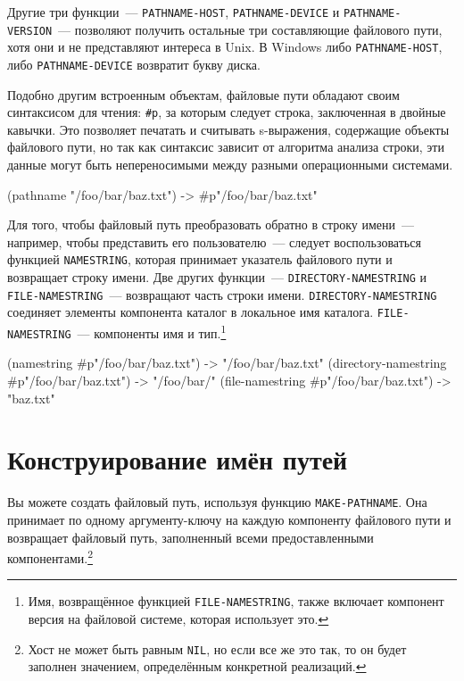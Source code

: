 Другие три функции~--- \lstinline{PATHNAME-HOST}, \lstinline{PATHNAME-DEVICE} и
\lstinline{PATHNAME-VERSION}~--- позволяют получить остальные три составляющие файлового пути,
хотя они и не представляют интереса в Unix. В Windows либо \lstinline{PATHNAME-HOST}, либо
\lstinline{PATHNAME-DEVICE} возвратит букву диска.

Подобно другим встроенным объектам, файловые пути обладают своим синтаксисом для чтения:
\lstinline!#p!, за которым следует строка, заключенная в двойные кавычки. Это позволяет
печатать и считывать s-выражения, содержащие объекты файлового пути, но так как синтаксис
зависит от алгоритма анализа строки, эти данные могут быть непереносимыми между разными
операционными системами.

\begin{myverb}
(pathname "/foo/bar/baz.txt") -> #p"/foo/bar/baz.txt" 
\end{myverb}

Для того, чтобы файловый путь преобразовать обратно в строку имени~--- например, чтобы
представить его пользователю~--- следует воспользоваться функцией \lstinline{NAMESTRING},
которая принимает указатель файлового пути и возвращает строку имени. Две других
функции~--- \lstinline{DIRECTORY-NAMESTRING} и \lstinline{FILE-NAMESTRING}~--- возвращают часть
строки имени. \lstinline{DIRECTORY-NAMESTRING} соединяет элементы компонента каталог в
локальное имя каталога. \lstinline{FILE-NAMESTRING}~--- компоненты имя и тип.\footnote{Имя,
  возвращённое функцией \lstinline{FILE-NAMESTRING}, также включает компонент версия на
  файловой системе, которая использует это.}

\begin{myverb}
(namestring #p"/foo/bar/baz.txt")           -> "/foo/bar/baz.txt" 
(directory-namestring #p"/foo/bar/baz.txt") -> "/foo/bar/" 
(file-namestring #p"/foo/bar/baz.txt")      -> "baz.txt" 
\end{myverb}

\section{Конструирование имён путей}

Вы можете создать файловый путь, используя функцию \lstinline{MAKE-PATHNAME}. Она принимает по
одному аргументу-ключу на каждую компоненту файлового пути и возвращает файловый путь,
заполненный всеми предоставленными компонентами.\footnote{Хост не может быть равным
  \lstinline{NIL}, но если все же это так, то он будет заполнен значением, определённым
  конкретной реализаций.}

